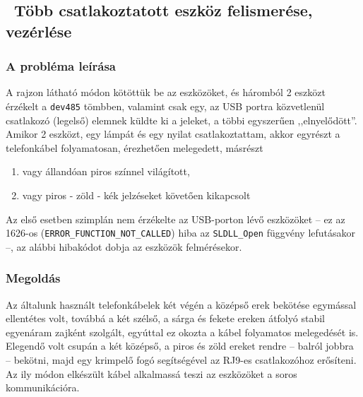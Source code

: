 \documentclass[tocnopagenum]{thesis-ekf}
\begin{document}
	\subsection{\ Több csatlakoztatott eszköz felismerése, vezérlése}
	\subsubsection{A probléma leírása}
	A rajzon látható módon kötöttük be az eszközöket, és háromból 2 eszközt érzékelt a \verb*|dev485| tömbben, valamint csak egy, az USB portra közvetlenül csatlakozó (legelső) elemnek küldte ki a jeleket, a többi egyszerűen ,,elnyelődött''.
	Amikor 2 eszközt, egy lámpát és egy nyilat csatlakoztattam, akkor egyrészt a telefonkábel folyamatosan, érezhetően melegedett, másrészt 
	\renewcommand{\labelenumi}{\alph{enumi})}
	\begin{enumerate}
		\item vagy állandóan piros színnel világított, 
		\item vagy piros - zöld - kék jelzéseket követően kikapcsolt
	\end{enumerate}
	Az első esetben szimplán nem érzékelte az USB-porton lévő eszközöket -- ez az 1626-os (\verb*|ERROR_FUNCTION_NOT_CALLED|) hiba az \verb*|SLDLL_Open| függvény lefutásakor --, az alábbi hibakódot dobja az eszközök felmérésekor.
	\subsubsection{Megoldás} Az általunk használt telefonkábelek két végén a középső erek bekötése egymással ellentétes volt, továbbá a két szélső, a sárga és fekete ereken átfolyó stabil egyenáram zajként szolgált, egyúttal ez okozta a kábel folyamatos melegedését is. Elegendő volt csupán a két középső, a piros és zöld ereket rendre -- balról jobbra --  bekötni, majd egy krimpelő fogó segítségével az RJ9-es csatlakozóhoz erősíteni. Az ily módon elkészült kábel alkalmassá teszi az eszközöket a soros kommunikációra.
\end{document}

